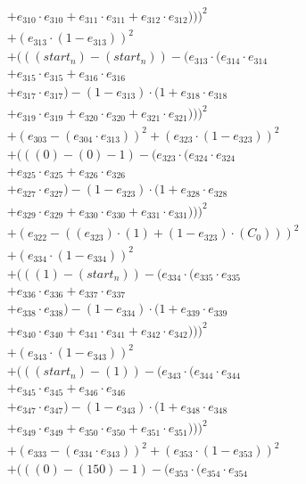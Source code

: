 \documentclass[10pt, a4paper]{article}
\begin{document}
\begin{align*}
& + e_{310} \cdot e_{310} + e_{311} \cdot e_{311} + e_{312} \cdot e_{312})))^{2} \\
& + (e_{313} \cdot (1 - e_{313}))^{2} \\
& + (((start_n) - (start_n)) - (e_{313} \cdot (e_{314} \cdot e_{314} \\
& + e_{315} \cdot e_{315} + e_{316} \cdot e_{316} \\
& + e_{317} \cdot e_{317}) - (1 - e_{313}) \cdot (1 + e_{318} \cdot e_{318} \\
& + e_{319} \cdot e_{319} + e_{320} \cdot e_{320} + e_{321} \cdot e_{321})))^{2} \\
& + (e_{303} - (e_{304} \cdot e_{313}))^{2} + (e_{323} \cdot (1 - e_{323}))^{2} \\
& + (((0) - (0) - 1) - (e_{323} \cdot (e_{324} \cdot e_{324} \\
& + e_{325} \cdot e_{325} + e_{326} \cdot e_{326} \\
& + e_{327} \cdot e_{327}) - (1 - e_{323}) \cdot (1 + e_{328} \cdot e_{328} \\
& + e_{329} \cdot e_{329} + e_{330} \cdot e_{330} + e_{331} \cdot e_{331})))^{2} \\
& + (e_{322} - ((e_{323})  \cdot  (1) + (1 - e_{323})  \cdot  (C_{0})))^{2} \\
& + (e_{334} \cdot (1 - e_{334}))^{2} \\
& + (((1) - (start_n)) - (e_{334} \cdot (e_{335} \cdot e_{335} \\
& + e_{336} \cdot e_{336} + e_{337} \cdot e_{337} \\
& + e_{338} \cdot e_{338}) - (1 - e_{334}) \cdot (1 + e_{339} \cdot e_{339} \\
& + e_{340} \cdot e_{340} + e_{341} \cdot e_{341} + e_{342} \cdot e_{342})))^{2} \\
& + (e_{343} \cdot (1 - e_{343}))^{2} \\
& + (((start_n) - (1)) - (e_{343} \cdot (e_{344} \cdot e_{344} \\
& + e_{345} \cdot e_{345} + e_{346} \cdot e_{346} \\
& + e_{347} \cdot e_{347}) - (1 - e_{343}) \cdot (1 + e_{348} \cdot e_{348} \\
& + e_{349} \cdot e_{349} + e_{350} \cdot e_{350} + e_{351} \cdot e_{351})))^{2} \\
& + (e_{333} - (e_{334} \cdot e_{343}))^{2} + (e_{353} \cdot (1 - e_{353}))^{2} \\
& + (((0) - (150) - 1) - (e_{353} \cdot (e_{354} \cdot e_{354} \\

\end{align*}
\end{document}
